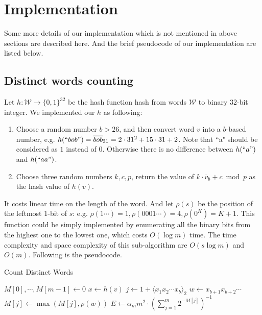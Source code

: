 \documentclass{article}
\begin{document}
\section{Implementation}
		Some more details of our implementation which is not mentioned in above sections are described here. And the brief pseudocode of
		our implementation are listed below.

        \subsection{Distinct words counting}
            Let $h: \mathcal{W} \rightarrow \{0, 1\}^{32}$ be the hash function hash from words $\mathcal{W}$ to binary $32$-bit integer.
			We implemented our $h$ as following:
				\begin{enumerate}
					\item Choose a random number $b > 26$, and then convert word $v$ into a $b$-based number, e.g. $h(``bob") =
						\overline{bob}_{31} = 
						2 \cdot 31^2 + 15 \cdot 31 + 2$. Note that ``a" should be considered as $1$ instead of $0$. Otherwise there is no
						difference between $h(``a")$ and $h(``aa")$.
					\item Choose three random numbers $k, c, p$, return the value of $k \cdot \overline{v}_b + c \bmod{p}$ as the hash value
						of $h(v)$.
				\end{enumerate}
			It costs linear time on the length of the word.
			\newline
			\newline
            And let $\rho(s)$ be the position of the leftmost $1$-bit of $s$: e.g. $\rho(1\cdots) = 1, \rho(0001\cdots) = 4, \rho(0^K) = K + 1$.
			This function could be simply implemented by enumerating all the binary bits from the highest one to the lowest one, which costs
			$O(\log m)$ time.
			The time complexity and space complexity of this sub-algorithm are $O(s \log m)$ and $O(m)$. Following is the pseudocode.

                \begin{center}
\begin{algorithm}[H]
\caption{Count Distinct Words}
                \begin{algorithmic}
                                \State $M[0], \cdots, M[m - 1]\gets 0$
                                        \State $x \gets h(v)$
                                        \State $j \gets 1 + \langle x_1 x_2 \cdots x_b \rangle_2$
                                        \State $w \gets x_{b + 1}x_{b + 2}\cdots$
                                        \State $M[j] \gets \max(M[j], \rho(w))$
                                \EndFor
                                \State \Return $E \gets \alpha_m m^2 \cdot (\sum\limits^m_{j = 1} 2^{-M[j]})^{-1}$
                        \EndFunction
                \end{algorithmic}
\end{algorithm}
                \end{center}
\end{document}
